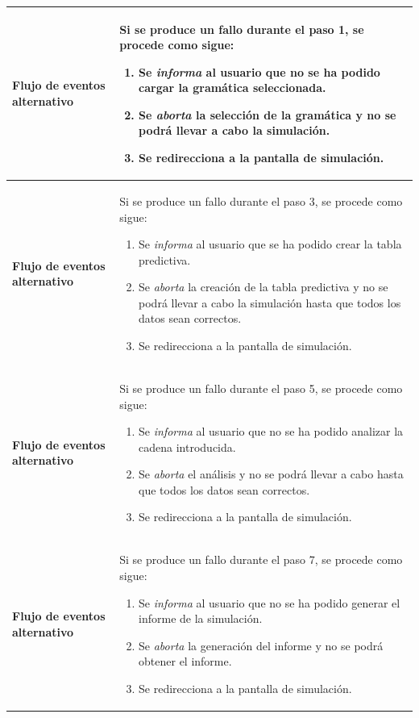 \begin{longtable}[H]{|>{\columncolor[rgb]{0.63,0.79,0.95}}m{6cm} | m{8.5cm} |}
  \textbf{Flujo de eventos alternativo} & Si se produce un fallo durante el paso 1, se procede como sigue:
     \begin{enumerate}
     \item Se \textit{informa} al usuario que no se ha podido cargar la gramática seleccionada.
     \item Se \textit{aborta} la selección de la gramática y no se podrá llevar a cabo la  simulación.
     \item Se redirecciona a la pantalla de simulación.			\end{enumerate}    \\ \hline
  \textbf{Flujo de eventos alternativo} & Si se produce un fallo durante el paso 3, se procede como sigue:
     \begin{enumerate}
     \item Se \textit{informa} al usuario que se ha podido crear la tabla predictiva.
     \item Se \textit{aborta} la creación de la tabla predictiva y no se podrá llevar a cabo la simulación hasta que todos los datos sean correctos.
     \item Se redirecciona a la pantalla de simulación.
     \end{enumerate}   \\ \hline
  \textbf{Flujo de eventos alternativo} & Si se produce un fallo durante el paso 5, se procede como sigue:
     \begin{enumerate}
     \item Se \textit{informa} al usuario que no se ha podido analizar la cadena introducida.
     \item Se \textit{aborta} el análisis y no se podrá llevar a cabo hasta que todos los datos sean correctos.
     \item Se redirecciona a la pantalla de simulación.			\end{enumerate}   \\ \hline
 \textbf{Flujo de eventos alternativo} & Si se produce un fallo durante el paso 7, se procede como sigue:
     \begin{enumerate}
     \item Se \textit{informa} al usuario que no se ha podido generar el informe de la simulación.
     \item Se \textit{aborta} la generación del informe y no se podrá obtener el informe.
     \item Se redirecciona a la pantalla de simulación.			\end{enumerate}
   \label{tabla716}
 \end{longtable}

